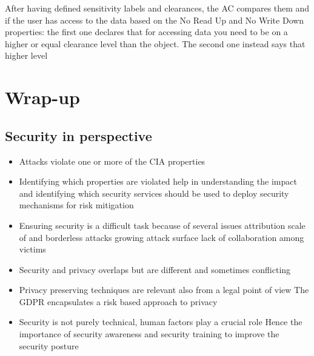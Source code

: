 \documentclass[12pt, a4paper]{article}
\begin{document}
After having defined sensitivity labels and clearances, the AC compares them and if the user has access to the data
based on the No Read Up and No Write Down properties: the first one declares that for accessing data you need to 
be on a higher or equal clearance level than the object. The second one instead says that higher level 



\newpage
\section{Wrap-up}
\subsection{Security in perspective}
\begin{itemize}
    \item Attacks violate one or more of the CIA properties
    \item Identifying which properties are violated help in
    \subitem understanding the impact and
    \subitem identifying which security services should be used to deploy security mechanisms for risk mitigation
    \item Ensuring security is a difficult task because of several issues
    \subitem attribution
    \subitem scale of and borderless attacks
    \subitem growing attack surface
    \subitem lack of collaboration among victims
    \item Security and privacy overlaps but are different and sometimes conflicting
    \item Privacy preserving techniques are relevant also from a legal point of view
    \subitem The GDPR encapsulates a risk based approach to privacy
    \item Security is not purely technical, human factors play a crucial role
    \subitem Hence the importance of security awareness and security training to improve the security posture
\end{itemize}
\end{document}
